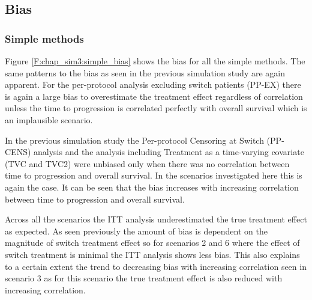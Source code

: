 \clearpage


\subsection{Bias}

\subsubsection{Simple methods}

Figure \ref{F:chap_sim3:simple_bias} shows the bias for all the simple methods. The same patterns to the bias as seen in the previous simulation study are again apparent. For the per-protocol analysis excluding switch patients (PP-EX) there is again a large bias to overestimate the treatment effect regardless of correlation unless the time to progression is correlated perfectly with overall survival which is an implausible scenario. 

In the previous simulation study the Per-protocol Censoring at Switch (PP-CENS) analysis and the analysis including Treatment as a time-varying covariate (TVC and TVC2) were unbiased only when there was no correlation between time to progression and overall survival. In the scenarios investigated here this is again the case. It can be seen that the bias increases with increasing correlation between time to progression and overall survival. 

Across all the scenarios the ITT analysis underestimated the true treatment effect as expected. As seen previously the amount of bias is dependent on the magnitude of switch treatment effect so for scenarios 2 and 6 where the effect of switch treatment is minimal the ITT analysis shows less bias. This also explains to a certain extent the trend to decreasing bias with increasing correlation seen in scenario 3 as for this scenario the true treatment effect is also reduced with increasing correlation.

